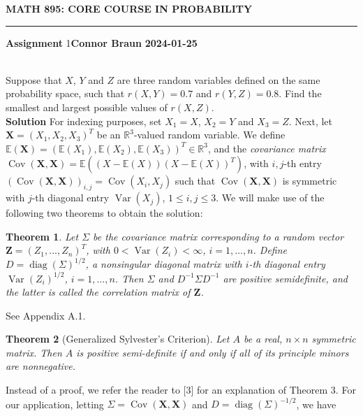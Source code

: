 \documentclass[10pt]{article}
\newcommand{\bs}[1]{\boldsymbol{#1}}
\newcommand{\E}{\mathbb{E}}
\newcommand{\mbb}[1]{\mathbb{#1}}
\newcommand{\1}[1]{\mathbbm{1}_{#1}}
\DeclareMathOperator{\Var}{Var}
\DeclareMathOperator{\Cov}{Cov}
\DeclareMathOperator{\diag}{diag}
\newtheorem{theorem}{Theorem}
\begin{document}
    \begin{center}
        {\bf\large{MATH 895: CORE COURSE IN PROBABILITY}}
        \smallskip
        \hrule
        \smallskip
        {\bf Assignment} 1\hfill {\bf Connor Braun} \hfill {\bf 2024-01-25}
    \end{center}
    \\[5pt]
    Suppose that $X$, $Y$ and $Z$ are three random variables defined on the same probability space, such that $r(X,Y)=0.7$ and $r(Y,Z)=0.8$. Find the smallest and largest possible
    values of $r(X,Z)$.\\[5pt]
    {\bf Solution}\hspace{5pt}
    For indexing purposes, set $X_1=X$, $X_2=Y$ and $X_3=Z$. Next, let $\bs{X}=(X_1,X_2,X_3)^T$ be an $\mbb{R}^3$-valued random variable. We define $\E(\bs{X})=(\E(X_1),\E(X_2),\E(X_3))^T\in\mbb{R}^3$, and
    the {\it covariance matrix} $\Cov(\bs{X},\bs{X})=\E((X-\E(X))(X-\E(X))^T)$, with $i,j$-th entry $(\Cov(\bs{X},\bs{X}))_{i,j}=\Cov(X_i,X_j)$ such that $\Cov(\bs{X},\bs{X})$ is symmetric with $j$-th diagonal entry $\Var(X_j)$, $1\leq i,j\leq 3$.
    We will make use of the following two theorems to obtain the solution:
    \begin{theorem}
        Let $\Sigma$ be the covariance matrix corresponding to a random vector $\bs{Z}=(Z_1,\dots,Z_n)^T$, with $0<\Var(Z_i)<\infty$, $i=1,\dots,n$. Define $D=\diag(\Sigma)^{1/2}$, a nonsingular diagonal matrix with $i$-th diagonal entry $\Var(Z_i)^{1/2}$, $i=1,\dots,n$. Then $\Sigma$ and $D^{-1}\Sigma D^{-1}$ are positive semidefinite,
        and the latter is called the correlation matrix of $\bs{Z}$.
    \end{theorem}
     See Appendix A.1.
    \begin{theorem}[Generalized Sylvester's Criterion]
        Let $A$ be a real, $n\times n$ symmetric matrix. Then $A$ is positive semi-definite if and only if all of its principle minors are nonnegative.
    \end{theorem}
    \noindent Instead of a proof, we refer the reader to [3] for an explanation of Theorem 3. For our application, letting $\Sigma=\Cov(\bs{X},\bs{X})$ and $D=\diag(\Sigma)^{-1/2}$, we have
\end{document}
